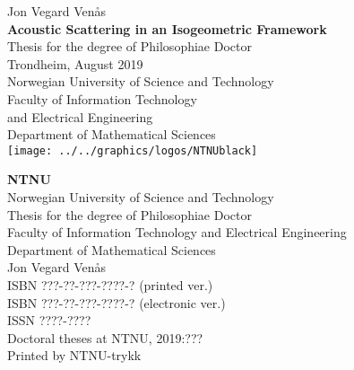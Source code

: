 \thispagestyle{empty}%
\begin{titlepage}
\begin{adjustwidth}{1.7cm}{1.7cm}
    \null%
    \raggedright%
    \LARGE\textcolor{black!60}{Jon Vegard Ven{\aa}s}\\
	\vspace{2cm}%
	\huge%
	\textbf{Acoustic Scattering in an Isogeometric Framework}\\
	\vspace{6.5cm}%
	\large%
	Thesis for the degree of Philosophiae Doctor\\
	\vspace{\baselineskip}%
	Trondheim, August 2019\\
	\vspace{\baselineskip}%
	Norwegian University of Science and Technology\\
	Faculty of Information Technology\\
	and Electrical Engineering\\
	Department of Mathematical Sciences\\
	\vspace*{1.7cm}%
	\texttt{[image: ../../graphics/logos/NTNUblack]}
\end{adjustwidth}        
\end{titlepage}
\newpage
\thispagestyle{empty}%
\begin{adjustwidth}{1.2cm}{1.2cm}
	\null\vspace{12cm}%
	\raggedright\footnotesize%
	\textbf{NTNU}\\
	Norwegian University of Science and Technology\\
	\vspace{\baselineskip}%
	Thesis for the degree of Philosophiae Doctor\\
	\vspace{\baselineskip}%
	Faculty of Information Technology and Electrical Engineering\\
	Department of Mathematical Sciences\\
	\vspace{\baselineskip}%
	\textcopyright\xspace Jon Vegard Ven{\aa}s\\
	\vspace{\baselineskip}%
	ISBN ???-??-???-????-? (printed ver.)\\
	ISBN ???-??-???-????-? (electronic ver.)\\
	ISSN ????-????\\
	\vspace{\baselineskip}%
	Doctoral theses at NTNU, 2019:???\\
	\vspace{\baselineskip}%
	Printed by NTNU-trykk
\end{adjustwidth}        